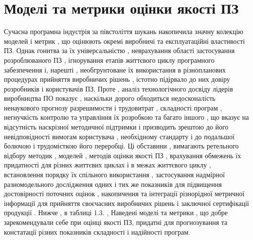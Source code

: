 \section{Моделі та метрики оцінки якості ПЗ}
\label{2section:id6}
Сучасна програмна індустрія за півстоліття шукань накопичила значну колекцію моделей і метрик , що оцінюють окремі виробничі та експлуатаційні властивості ПЗ. Однак гонитва за їх універсальністю , неврахування області застосування розроблюваного ПЗ , ігнорування етапів життєвого циклу програмного забезпечення і, нарешті , необгрунтоване їх використання в різнопланових процедурах прийняття виробничих рішень , істотно підірвало до них довіру розробників і користувачів ПЗ.
Проте , аналіз технологічного досвіду лідерів виробництва ПО показує , наскільки дорого обходиться недосконалість ненаукового прогнозу разрешимости і трудовитрат , складності програм , негнучкість контролю та управління їх розробкою та багато іншого , що вказує на відсутність наскрізної методичної підтримки і призводить зрештою до його невідповідності вимогам користувача , необхідному стандарту і до подальшої болючою і трудомісткою його переробці. Ці обставини , вимагають ретельного відбору методик , моделей , методів оцінки якості ПЗ , врахування обмежень їх придатності для різних життєвих циклах і в межах життєвого циклу , встановлення порядку їх спільного використання , застосування надмірної разномодельного дослідження одних і тих же показників для підвищення достовірності поточних оцінок , накопичення та інтеграції різнорідної метричної інформації для прийняття своєчасних виробничих рішень і заключної сертифікації продукції . Нижче , в таблиці 1.3. , Наведені моделі та метрики , що добре зарекомендували себе при оцінці якості ПЗ, придатні для прогнозування та констатації різних показників складності і надійності програм.


